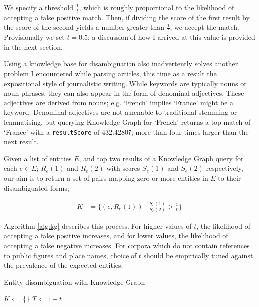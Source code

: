 We specify a threshold $\frac{1}{t}$, which is roughly proportional to the likelihood of accepting a false positive match. Then, if dividing the score of the first result by the score of the second yields a number greater than $\frac{1}{t}$, we accept the match. Provisionally we set $t=0.5$; a discussion of how I arrived at this value is provided in the next section.

Using a knowledge base for disambiguation also inadvertently solves another problem I encountered while parsing articles, this time as a result the expositional style of journalistic writing. While keywords are typically nouns or noun phrases, they can also appear in the form of denominal adjectives. These adjectives are derived from nouns; e.g. `French' implies `France' might be a keyword. Denominal adjectives are not amenable to traditional stemming or lemmatising, but querying Knowledge Graph for `French' returns a top match of `France' with a \texttt{resultScore} of 432.42807; more than four times larger than the next result.

Given a list of entities $E$, and top two results of a Knowledge Graph query for each $e \in E$; $R_e(1)$ and $R_e(2)$ with scores $S_e(1)$ and $S_e(2)$ respectively, our aim is to return a set of pairs mapping zero or more entities in $E$ to their disambiguated forms;

\begin{align*}
K &= \bigg\{(e, R_e(1))\;|\;\frac{S_e(1)}{S_e(2)} > \frac{1}{t}\bigg\}
\end{align*}

Algorithm \ref{alg:kg} describes this process. For higher values of $t$, the likelihood of accepting a false positive increases, and for lower values, the likelihood of accepting a false negative increases. For corpora which do not contain references to public figures and place names, choice of $t$ should be empirically tuned against the prevalence of the expected entities.

\begin{algorithm}
\label{alg:kg}
 \caption{Entity disambiguation with Knowledge Graph}
 $K \Leftarrow$ \{\}\;
 $T \Leftarrow 1\div{t}$\;
\end{algorithm}

